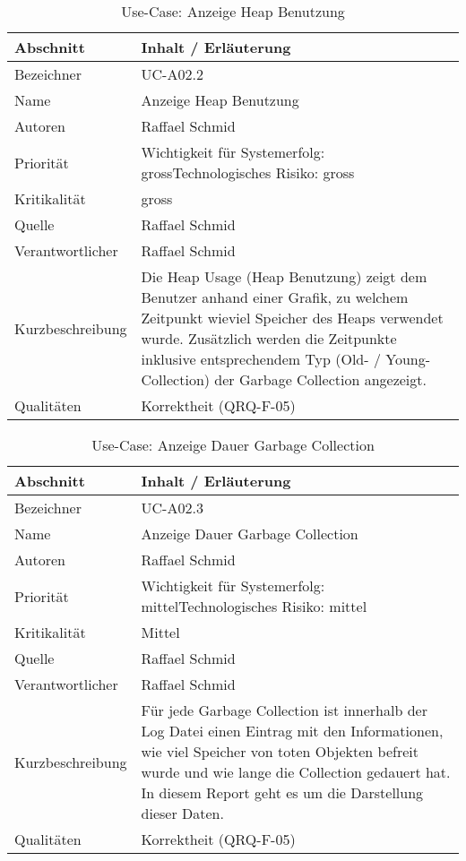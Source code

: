 \begin{longtable}{|p{4cm}|p{10.5cm}|}
\caption{Use-Case: Anzeige Heap Benutzung}\\\hline
   \textbf{Abschnitt} & \textbf{Inhalt / Erläuterung} \\\hline
   Bezeichner & UC-A02.2\\\hline
   Name & Anzeige Heap Benutzung\\\hline
   Autoren & Raffael Schmid\\\hline
   Priorität & Wichtigkeit für Systemerfolg: gross\newline Technologisches Risiko: gross\\\hline
   Kritikalität & gross\\\hline
   Quelle & Raffael Schmid\\\hline
   Verantwortlicher & Raffael Schmid\\\hline
   Kurzbeschreibung & Die Heap Usage (Heap Benutzung) zeigt dem Benutzer anhand einer Grafik, zu welchem Zeitpunkt wieviel Speicher des Heaps verwendet wurde. Zusätzlich werden die Zeitpunkte inklusive entsprechendem Typ (Old- / Young-Collection) der Garbage Collection angezeigt.  \\\hline
   Qualitäten & Korrektheit (QRQ-F-05)\\\hline
\end{longtable}

\begin{longtable}{|p{4cm}|p{10.5cm}|}
\caption{Use-Case: Anzeige Dauer Garbage Collection}\\\hline
   \textbf{Abschnitt} & \textbf{Inhalt / Erläuterung} \\\hline
   Bezeichner & UC-A02.3\\\hline
   Name & Anzeige Dauer Garbage Collection\\\hline
   Autoren & Raffael Schmid\\\hline
   Priorität & Wichtigkeit für Systemerfolg: mittel\newline Technologisches Risiko: mittel\\\hline
   Kritikalität & Mittel\\\hline
   Quelle & Raffael Schmid\\\hline
   Verantwortlicher & Raffael Schmid\\\hline
   Kurzbeschreibung & Für jede Garbage Collection ist innerhalb der Log Datei einen Eintrag mit den Informationen, wie viel Speicher von toten Objekten befreit wurde und wie lange die Collection gedauert hat. In diesem Report geht es um die Darstellung dieser Daten.\\\hline
   Qualitäten & Korrektheit (QRQ-F-05)\\\hline
\end{longtable}

